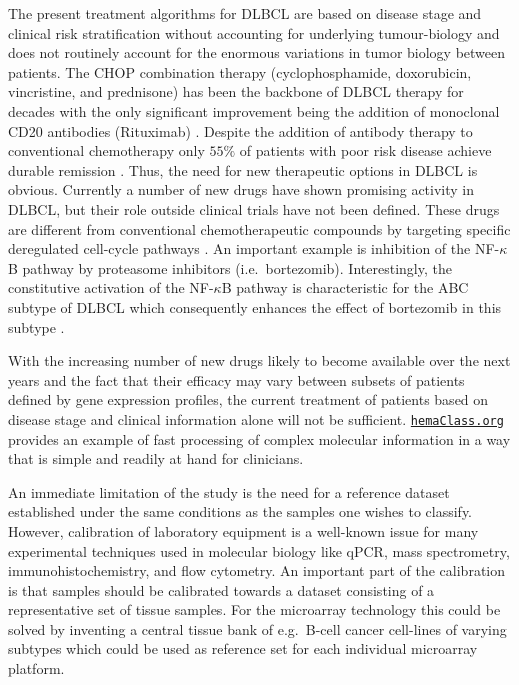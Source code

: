 \documentclass[10pt,letterpaper]{article}
\newcommand{\hemaClass}{\href{http://hemaClass.org}{\texttt{hemaClass.org}}}
\begin{document}
The present treatment algorithms for DLBCL are based on disease stage and clinical risk stratification without accounting for underlying tumour-biology \cite{Schmoll2012} and does not routinely account for the enormous variations in tumor biology between patients.
The CHOP combination therapy (cyclophosphamide, doxorubicin, vincristine, and prednisone) has been the backbone of DLBCL therapy for decades with the only significant improvement being the addition of monoclonal CD20 antibodies (Rituximab) \cite{Coiffier2002a}.
Despite the addition of antibody therapy to conventional chemotherapy only $55\%$ of patients with poor risk disease achieve durable remission \cite{Ziepert2010}.
Thus, the need for new therapeutic options in DLBCL is obvious.
Currently a number of new drugs have shown promising activity in DLBCL, but their role outside clinical trials have not been defined.
These drugs are different from conventional chemotherapeutic compounds by targeting specific deregulated cell-cycle pathways \cite{Friedberg2011}.
An important example is inhibition of the NF-$\kappa$B pathway by proteasome inhibitors (i.e.\ bortezomib).
Interestingly, the constitutive activation of the NF-$\kappa$B pathway is characteristic for the ABC subtype of DLBCL which consequently enhances the effect of bortezomib in this subtype \cite{Dunleavy2009}.

With the increasing number of new drugs likely to become available over the next years and the fact that their efficacy may vary between subsets of patients defined by gene expression profiles, the current treatment of patients based on disease stage and clinical information alone will not be sufficient.
\hemaClass{} provides an example of fast processing of complex molecular information in a way that is simple and readily at hand for clinicians.

An immediate limitation of the study is the need for a reference dataset established under the same conditions as the samples one wishes to classify.
However, calibration of laboratory equipment is a well-known issue for many experimental techniques used in molecular biology like qPCR, mass spectrometry, immunohistochemistry, and flow cytometry.
An important part of the calibration is that samples should be calibrated towards a dataset consisting of a representative set of tissue samples.
For the microarray technology this could be solved by inventing a central tissue bank of e.g.\ B-cell cancer cell-lines of varying subtypes which could be used as reference set for each individual microarray platform.
\end{document}
